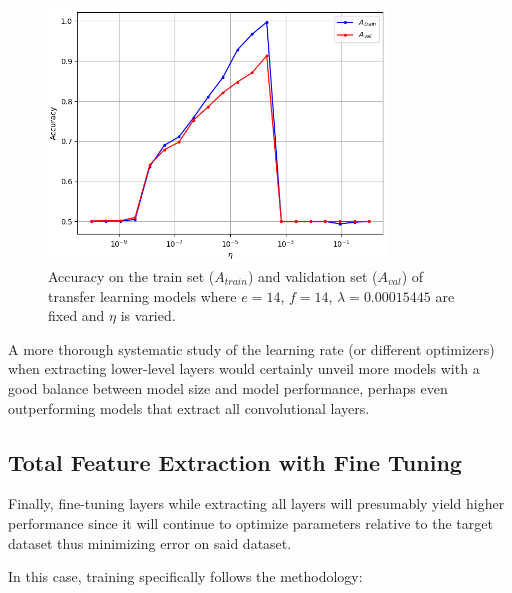 \begin{figure}[ht]
    \centering
    \includegraphics[width=0.8\textwidth]{figs/vgg16_partial_lr.png}
    \caption{Accuracy on the train set ($A_{train}$) and validation set ($A_{val}$) of transfer learning models where $e = 14$, $f = 14$, $\lambda = 0.00015445$ are fixed and $\eta$ is varied.}
    \label{fig:vgg16_partial_lr}
\end{figure}

A more thorough systematic study of the learning rate (or different optimizers) when extracting lower-level layers would certainly unveil more models with a good balance between model size and model performance, perhaps even outperforming models that extract all convolutional layers.

\subsection{Total Feature Extraction with Fine Tuning}

Finally, fine-tuning layers while extracting all layers will presumably yield higher performance since it will continue to optimize parameters relative to the target dataset thus minimizing error on said dataset.

In this case, training specifically follows the methodology:

